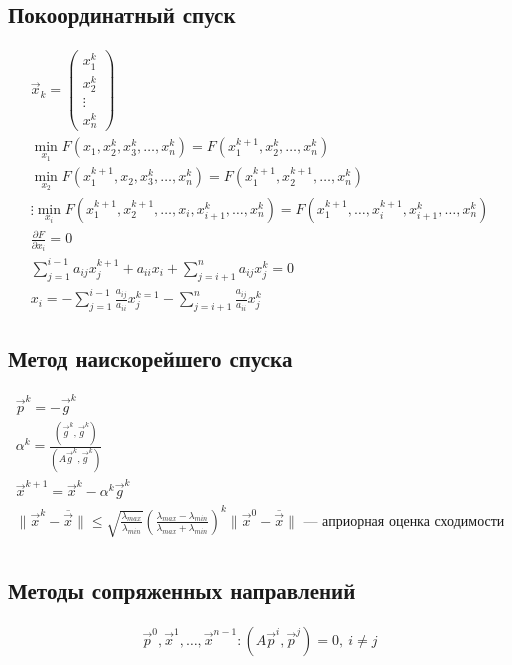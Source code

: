 \subsection{Покоординатный спуск}
\begin{gather*}
  \vec{x}_k =
  \begin{pmatrix}
    x_1^k\\
    x_2^k\\
    \vdots\\
    x_n^k
  \end{pmatrix} \\
  \min_{x_1} F(x_1, x_2^k, x_3^k, \dotsc, x_n^k) = F(x_1^{k + 1}, x_2^k,
  \dotsc, x_n^k) \\
  \min_{x_2} F(x_1^{k + 1}, x_2, x_3^k, \dotsc, x_n^k) = F(x_1^{k + 1}, x_2^{k +
    1}, \dotsc, x_n^k)\\
  \vdots
  \min_{x_i} F(x_1^{k + 1}, x_2^{k + 1}, \dotsc, x_i, x_{i + 1}^k, \dotsc,
  x_n^k) = F(x_1^{k + 1}, \dotsc, x_i^{k + 1}, x_{i + 1}^k, \dotsc, x_n^k) \\
  \frac{\partial F}{\partial x_i}= 0\\
  \sum_{j = 1}^{i - 1} a_{ij}x_j^{k + 1} + a_{ii}x_i + \sum_{j = i + 1}^n
  a_{ij}x_j^k = 0 \\
  x_i = - \sum_{j = 1}^{i - 1} \frac{a_{ij}}{a_{ii}} x_j^{k = 1} - \sum_{j = i +
  1}^n \frac{a_{ij}}{a_{ii}}x_j^k 
\end{gather*}

\subsection{Метод наискорейшего спуска}
\begin{gather*}
  \vec{p}^k = -\vec{g}^k \\
  \alpha^k = \frac{(\vec{g}^k, \vec{g}^k)}{(A \vec{g}^k, \vec{g}^k)} \\
  \vec{x}^{k + 1} = \vec{x}^k - \alpha^k \vec{g}^k \\
  \|\vec{x}^k - \overline{\vec{x}}\| \leq
  \sqrt{\frac{\lambda_{max}}{\lambda_{min}}} (\frac{\lambda_{max} -
    \lambda_{min}}{\lambda_{max} + \lambda_{min}})^k \|\vec{x}^0
  -\overline{\vec{x}}\| \text{ --- априорная оценка сходимости}\\
\end{gather*}

\subsection{Методы сопряженных направлений}
\begin{gather*}
   \vec{p}^0, \vec{x}^1, \dotsc, \vec{x}^{n - 1} : (A\vec{p}^i, \vec{p}^j) = 0,\
   i \neq j
\end{gather*}

